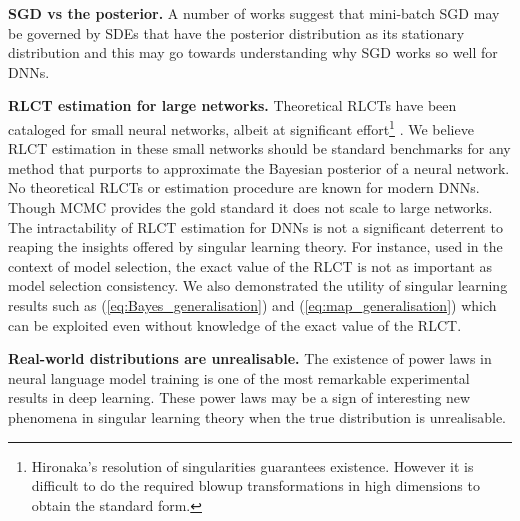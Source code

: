 \documentclass{article} %
\begin{document}
\textbf{SGD vs the posterior.} A number of works \citep{Simsekli17,mandt_stochastic_2018,smith_stochastic_2018} suggest that mini-batch SGD may be governed by SDEs that have the posterior distribution as its stationary distribution and this may go towards understanding why SGD works so well for DNNs. %

\textbf{RLCT estimation for large networks.} 
Theoretical RLCTs have been cataloged for small neural networks, albeit at significant effort\footnote{Hironaka's resolution of singularities guarantees existence. However it is difficult to do the required blowup transformations in high dimensions to obtain the standard form.} \citep{aoyagi_stochastic_2005, aoyagi_resolution_2006}. We believe RLCT estimation in these small networks should be standard benchmarks for any method that purports to approximate the Bayesian posterior of a neural network.
No theoretical RLCTs or estimation procedure are known for modern DNNs. Though MCMC provides the gold standard it does not scale to large networks.
The intractability of RLCT estimation for DNNs is not a significant deterrent to reaping the insights offered by singular learning theory. For instance, used in the context of model selection, the exact value of the RLCT is not as important as model selection consistency. We also demonstrated the utility of singular learning results such as (\ref{eq:Bayes_generalisation}) and (\ref{eq:map_generalisation}) which can be exploited even without knowledge of the exact value of the RLCT.

\textbf{Real-world distributions are unrealisable.}
The existence of power laws in neural language model training \citep{hestness_2017,kaplan2020scaling} is one of the most remarkable experimental results in deep learning. These power laws may be a sign of interesting new phenomena in singular learning theory when the true distribution is unrealisable.


\end{document}
